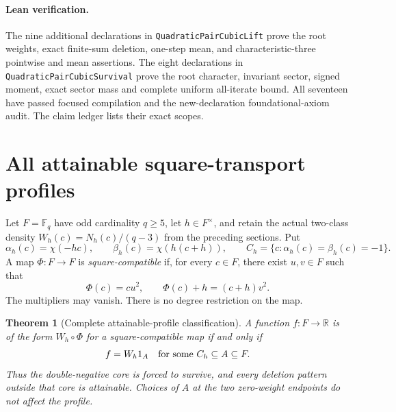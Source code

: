 \documentclass[11pt]{article}
\newtheorem{theorem}{Theorem}[section]
\begin{document}
\paragraph{Lean verification.}
The nine additional declarations in \texttt{QuadraticPairCubicLift}
prove the root weights, exact finite-sum deletion, one-step mean,
and characteristic-three pointwise and mean assertions.
The eight declarations in \texttt{QuadraticPairCubicSurvival} prove
the root character, invariant sector, signed moment, exact sector
mass and complete uniform all-iterate bound.
All seventeen have passed focused compilation and the new-declaration
foundational-axiom audit. The claim ledger lists their exact scopes.


\section{All attainable square-transport profiles}
\label{sec:squareTransportExtremal}

Let \(F=\mathbb F_q\) have odd cardinality \(q\ge5\), let
\(h\in F^\times\), and retain the actual two-class density
\(W_h(c)=N_h(c)/(q-3)\) from the preceding sections. Put
\[
 \alpha_h(c)=\chi(-hc),\qquad
 \beta_h(c)=\chi(h(c+h)),\qquad
 C_h=\{c:\alpha_h(c)=\beta_h(c)=-1\}.
\]
A map \(\Phi:F\to F\) is \emph{square-compatible} if, for every
\(c\in F\), there exist \(u,v\in F\) such that
\[
             \Phi(c)=cu^2,\qquad
             \Phi(c)+h=(c+h)v^2.
\]
The multipliers may vanish. There is no degree restriction on the map.

\begin{theorem}[Complete attainable-profile classification]
\label{thm:squareTransportProfiles}
A function \(f:F\to\mathbb R\) is of the form \(W_h\circ\Phi\)
for a square-compatible map if and only if
\[
                   f=W_h1_A
             \quad\hbox{for some }C_h\subseteq A\subseteq F.
\]
Thus the double-negative core is forced to survive, and every
deletion pattern outside that core is attainable. Choices of \(A\)
at the two zero-weight endpoints do not affect the profile.
\end{theorem}
\end{document}
